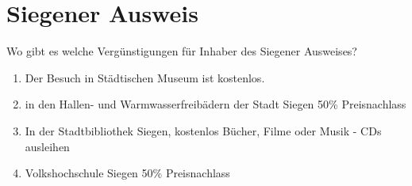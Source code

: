 \section{Siegener Ausweis} 
Wo gibt es welche Vergünstigungen für Inhaber des Siegener Ausweises?
\begin{enumerate}
	\item Der Besuch in Städtischen Museum ist kostenlos.
	\item in den Hallen- und Warmwasserfreibädern der Stadt Siegen 50\%  Preisnachlass 
	\item In der Stadtbibliothek Siegen, kostenlos Bücher, Filme oder Musik - CDs ausleihen 
	\item Volkshochschule Siegen 50\% Preisnachlass  
\end{enumerate}

\paragraph{}

